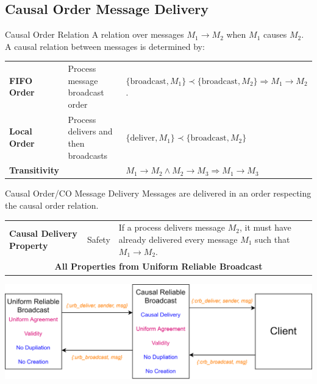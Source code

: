 \subsection{Causal Order Message Delivery}
\begin{definitionbox}{Causal Order Relation}
    A relation over messages $M_1 \to M_2$ when $M_1$ causes $M_2$. A causal relation between messages is determined by:
    \begin{center}
        \begin{tabular}{l l l}
            \textbf{FIFO Order} & Process message broadcast order & $\{ \text{broadcast}, M_1 \} \prec \{\text{broadcast}, M_2 \} \Rightarrow M_1 \to M_2$. \\
            \textbf{Local Order} & Process delivers and then broadcasts & $\{\text{deliver}, M_1 \} \prec \{\text{broadcast}, M_2\}$ \\
            \textbf{Transitivity} & & $M_1 \to M_2 \land M_2 \to M_3 \Rightarrow M_1 \to M_3$ \\
        \end{tabular}
    \end{center}
\end{definitionbox}

\begin{definitionbox}{Causal Order/CO Message Delivery}
    Messages are delivered in an order respecting the causal order relation.
    \begin{center}
        \begin{tabular}{l l p{}}
            \textbf{Causal Delivery Property} & Safety & If a process delivers message $M_2$, it must have already delivered every message $M_1$ such that $M_1 \to M_2$. \\
            \multicolumn{3}{c}{\textbf{All Properties from Uniform Reliable Broadcast}} \\
        \end{tabular}
    \end{center}
\end{definitionbox}
\begin{center}
    \includegraphics[width=.8\textwidth]{broadcast/images/causal_reliable_broadcast.drawio.png}
\end{center}
